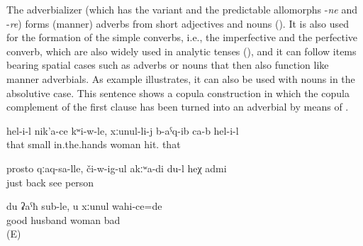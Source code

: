 The adverbializer  (which has the variant  and the predictable allomorphs -\textit{ne} and -\textit{re}) forms (manner) adverbs from short adjectives and nouns (). It is also used for the formation of the simple converbs, i.e., the imperfective and the perfective converb, which are also widely used in analytic tenses (), and it can follow items bearing spatial cases such as adverbs  or nouns  that then also function like manner adverbials. As example  illustrates, it can also be used with nouns in the absolutive case. This sentence shows a copula construction in which the copula complement of the first clause has been turned into an adverbial by means of .
%
\begin{exe}
	\ex	\label{ex:While she had the child in her arms, he hit his wife minor}
	\gll	hel-i-l	nik'a-ce	kʷi-w-le,	xːunul-li-j	b-aˁq-ib	ca-b	hel-i-l\\
		that	small	in.the.hands	woman	hit.		that\\
	\glt	{}

	\ex	\label{ex:‎‎Just with the back (turned to me), I do not see this person minor}
	\gll	prosto	qːaq-sa-lle,	či-w-ig-ul	akːʷa-di	du-l	heχ	admi\\
		just	back	see				person\\
	\glt	{}

	\ex	\label{ex:‎While I am a good husband, you are a bad wife minor}
	\gll	du	ʡaˁħ	sub-le,	u	xːunul	wahi-ce=de\\
			good	husband			woman	bad\\
	\glt	{} (E)
\end{exe}



%
%
